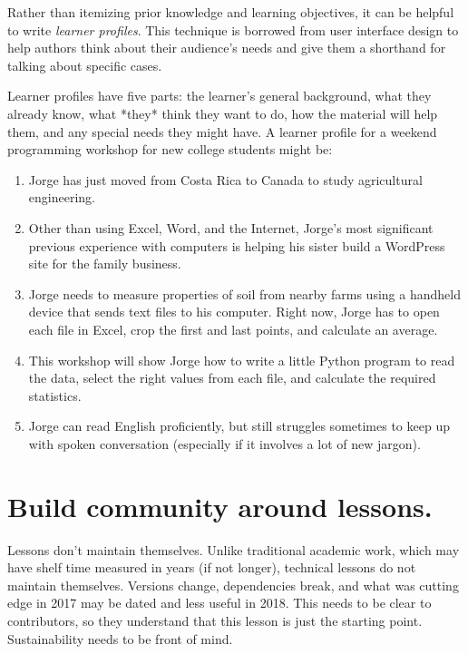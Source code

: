 \documentclass[10pt,letterpaper]{article}
\newcommand{\rulemajor}[1]{\section{#1}}
\begin{document}
Rather than itemizing prior knowledge and learning objectives,
it can be helpful to write \emph{learner profiles}.
This technique is borrowed from user interface design
to help authors think about their audience's needs
and give them a shorthand for talking about specific cases.

Learner profiles have five parts:
the learner's general background,
what they already know,
what *they* think they want to do,
how the material will help them,
and any special needs they might have.
A learner profile for a weekend programming workshop for new college students might be:

\begin{enumerate}

\item
  Jorge has just moved from Costa Rica to Canada
  to study agricultural engineering.

\item
  Other than using Excel, Word, and the Internet,
  Jorge's most significant previous experience with computers is
  helping his sister build a WordPress site for the family business.

\item
  Jorge needs to measure properties of soil from nearby farms
  using a handheld device that sends text files to his computer.
  Right now, Jorge has to open each file in Excel,
  crop the first and last points,
  and calculate an average.

\item
  This workshop will show Jorge how to write a little Python program
  to read the data,
  select the right values from each file,
  and calculate the required statistics.

\item
  Jorge can read English proficiently,
  but still struggles sometimes to keep up with spoken conversation
  (especially if it involves a lot of new jargon).

\end{enumerate}

\rulemajor{Build community around lessons.}

Lessons don't maintain themselves.
Unlike traditional academic work,
which may have shelf time measured
in years (if not longer),
technical lessons do not maintain themselves.
Versions change, dependencies break,
and what was cutting edge in 2017 may be dated
and less useful in 2018.
This needs to be clear to contributors,
so they understand that this lesson is just
the starting point.
Sustainability needs to be front of mind.
\end{document}
